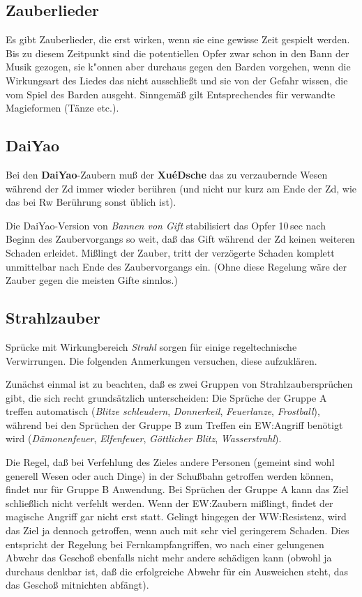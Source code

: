 \documentclass[10pt,a4paper,germanpar]{article}
\begin{document}
\subsection{Zauberlieder}

Es gibt Zauberlieder, die erst wirken, wenn sie eine gewisse Zeit
gespielt werden. Bis zu diesem Zeitpunkt sind die potentiellen Opfer
zwar schon in den Bann der Musik gezogen, sie k"onnen aber durchaus
gegen den Barden vorgehen, wenn die Wirkungsart des Liedes das nicht
ausschließt und sie von der Gefahr wissen, die vom Spiel des Barden
ausgeht. Sinngemäß gilt Entsprechendes für verwandte Magieformen
(Tänze etc.).

\subsection{DaiYao}

Bei den \textbf{DaiYao}-Zaubern muß der \textbf{XuéDsche} das zu
verzaubernde Wesen während der Zd immer wieder berühren (und nicht nur
kurz am Ende der Zd, wie das bei Rw Berührung sonst üblich ist).

Die DaiYao-Version von \emph{Bannen von Gift} stabilisiert das Opfer
10\,sec nach Beginn des Zaubervorgangs so weit, daß das Gift während
der Zd keinen weiteren Schaden erleidet. Mißlingt der Zauber, tritt
der verzögerte Schaden komplett unmittelbar nach Ende des
Zaubervorgangs ein. (Ohne diese Regelung wäre der Zauber gegen die
meisten Gifte sinnlos.)

\subsection{Strahlzauber}
\label{strahlzauber}

Sprücke mit Wirkungbereich \emph{Strahl} sorgen für einige
regeltechnische Verwirrungen. Die folgenden Anmerkungen versuchen,
diese aufzuklären.

Zunächst einmal ist zu beachten, daß es zwei Gruppen von
Strahlzaubersprüchen gibt, die sich recht grundsätzlich unterscheiden:
Die Sprüche der Gruppe A treffen automatisch (\emph{Blitze
  schleudern}, \emph{Donnerkeil}, \emph{Feuerlanze},
\emph{Frostball}), während bei den Sprüchen der Gruppe B zum Treffen
ein EW:Angriff benötigt wird (\emph{Dämonenfeuer}, \emph{Elfenfeuer},
\emph{Göttlicher Blitz}, \emph{Wasserstrahl}).

Die Regel, daß bei Verfehlung des Zieles andere Personen (gemeint sind
wohl generell Wesen oder auch Dinge) in der Schußbahn getroffen werden
können, findet nur für Gruppe B Anwendung. Bei Sprüchen der Gruppe A
kann das Ziel schließlich nicht verfehlt werden. Wenn der EW:Zaubern
mißlingt, findet der magische Angriff gar nicht erst statt. Gelingt
hingegen der WW:Resistenz, wird das Ziel ja dennoch getroffen, wenn
auch mit sehr viel geringerem Schaden. Dies entspricht der Regelung
bei Fernkampfangriffen, wo nach einer gelungenen Abwehr das Geschoß
ebenfalls nicht mehr andere schädigen kann (obwohl ja durchaus denkbar
ist, daß die erfolgreiche Abwehr für ein Ausweichen steht, das das
Geschoß mitnichten abfängt).
\end{document}
